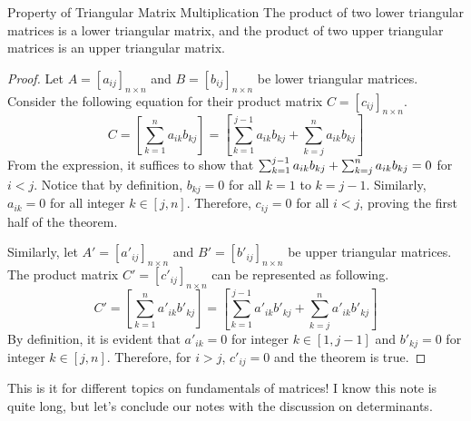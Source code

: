 \documentclass[../../main.tex]{subfiles}
\begin{document}
\begin{theorem}{}{Property of Triangular Matrix Multiplication}
The product of two lower triangular matrices is a lower triangular
matrix, and the product of two upper triangular matrices is an upper
triangular matrix.
\end{theorem}
\begin{proof}
Let $A = [a_{ij}]_{n \times n}$ and $B = [b_{ij}]_{n \times n}$ be
lower triangular matrices. Consider the following equation for their
product matrix $C = [c_{ij}]_{n \times n}$.
\[
C
= \left[ \sum_{k = 1}^{n} a_{ik} b_{kj} \right]
= \left[
    \sum_{k = 1}^{j-1} a_{ik} b_{kj}
        + \sum_{k = j}^{n} a_{ik} b_{kj}
\right]
\]
From the expression, it suffices to show that $\sum_{k = 1}^{j-1}
a_{ik} b_{kj} + \sum_{k = j}^{n} a_{ik} b_{kj} \linebreak = 0$ for
$i < j$. Notice that by definition, $b_{kj} = 0$ for all $k = 1$ to
$k = j-1$. Similarly, $a_{ik} = 0$ for all integer $k \in [j, n]$.
Therefore, $c_{ij} = 0$ for all $i < j$, proving the first half of
the theorem.

Similarly, let $A' = [a'_{ij}]_{n \times n}$ and $B' =
[b'_{ij}]_{n \times n}$ be upper triangular matrices. The product
matrix $C'= [c'_{ij}]_{n \times n}$ can be represented as following.
\[
C'
= \left[ \sum_{k = 1}^{n} a'_{ik} b'_{kj} \right]
= \left[
    \sum_{k = 1}^{j-1} a'_{ik} b'_{kj}
        + \sum_{k = j}^{n} a'_{ik} b'_{kj}
\right]
\]
By definition, it is evident that $a'_{ik} = 0$ for integer $k
\in [1, j-1]$ and $b'_{kj} = 0$ for integer $k \in [j, n]$.
Therefore, for $i > j$, $c'_{ij} = 0$ and the theorem is true.
\end{proof}

This is it for different topics on fundamentals of matrices! I know
this note is quite long, but let's conclude our notes with the
discussion on determinants.
\end{document}
